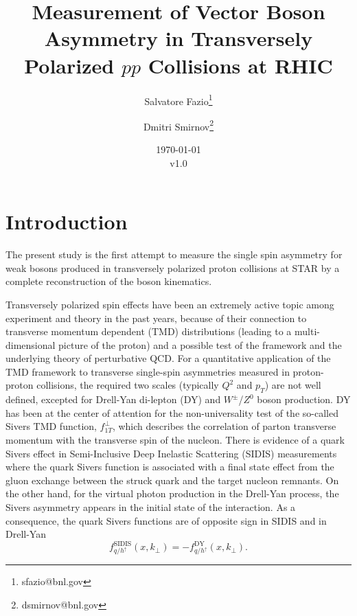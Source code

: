 \documentclass[12pt]{article}
\begin{document}
\setcounter{section}{0}
\setcounter{subsection}{0}
\setcounter{equation}{0}
\setcounter{figure}{0}
\setcounter{footnote}{0}
\setcounter{table}{0}

\title{Measurement of Vector Boson Asymmetry in Transversely Polarized $pp$
Collisions at RHIC}

\author{Salvatore Fazio\thanks{sfazio@bnl.gov}}
\author{Dmitri Smirnov\thanks{dsmirnov@bnl.gov}}

\date{\today\\v1.0}

\maketitle

\newpage
\tableofcontents 

\newpage
\linenumbers


\section{Introduction}

The present study is the first attempt to measure the single spin asymmetry for weak bosons produced
in transversely polarized proton collisions at STAR by a complete reconstruction of the boson kinematics. 

Transversely polarized spin effects have been an extremely active topic among experiment and theory in the past years, because of their connection to transverse momentum dependent (TMD) distributions (leading to a multi-dimensional picture of the proton) and a possible test of the framework and the underlying theory of perturbative QCD. For a quantitative application of the TMD framework to transverse single-spin asymmetries measured in proton-proton collisions, the required two scales (typically $Q^{2}$ and $p_{T}$) are not well defined, excepted for Drell-Yan di-lepton (DY) and $W^{\pm}$/$Z^{0}$ boson production. DY has been at the center of attention for the non-universality test of the so-called Sivers TMD function, %
$f^{\perp}_{1T}$, which describes the correlation of parton transverse momentum with the transverse spin of the nucleon.  There is evidence of a quark Sivers effect in Semi-Inclusive Deep Inelastic Scattering (SIDIS) measurements where the quark Sivers function is associated with a final state effect from the gluon exchange between the struck quark and the target nucleon remnants. On the other hand, for the virtual photon production in the Drell-Yan process, the Sivers asymmetry appears in the initial state of the interaction. As a consequence, the quark Sivers functions are of opposite sign in SIDIS and in Drell-Yan
%
\begin{equation}
f^\text{SIDIS}_{q/h^\uparrow} (x, k_\perp) = - f^\text{DY}_{q/h^\uparrow} (x, k_\perp).
\end{equation}
\end{document}
